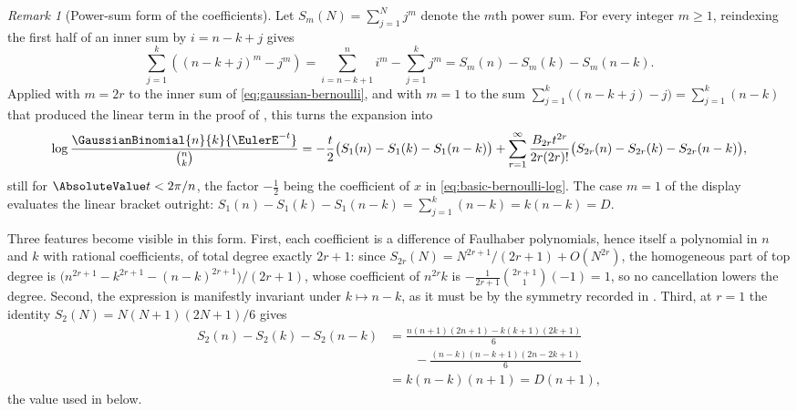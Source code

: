\documentclass[11pt,a4paper,oneside,openany]{book}
\theoremstyle{definition}
\theoremstyle{remark}
\newtheorem{remark}[remark]{Remark}
\begin{document}
\begin{remark}[Power-sum form of the coefficients]
Let $S_m(N)=\sum_{j=1}^{N}j^{m}$ denote the $m$th power sum.  For every integer $m\ge1$, reindexing the first half of an inner sum by $i=n-k+j$ gives
\[
 \sum_{j=1}^{k}\left((n-k+j)^{m}-j^{m}\right)
 =\sum_{i=n-k+1}^{n}i^{m}-\sum_{j=1}^{k}j^{m}
 =S_{m}(n)-S_{m}(k)-S_{m}(n-k).
\]
Applied with $m=2r$ to the inner sum of \eqref{eq:gaussian-bernoulli}, and with $m=1$ to the sum $\sum_{j=1}^{k}\bigl((n-k+j)-j\bigr)=\sum_{j=1}^{k}(n-k)$ that produced the linear term in the proof of , this turns the expansion into
\[
 \log\frac{\GaussianBinomial{n}{k}{\EulerE^{-t}}}{\binom nk}
 =-\frac t2\bigl(S_1(n)-S_1(k)-S_1(n-k)\bigr)
 +\sum_{r=1}^{\infty}\frac{B_{2r}t^{2r}}{2r(2r)!}
 \bigl(S_{2r}(n)-S_{2r}(k)-S_{2r}(n-k)\bigr),
\]
still for $\AbsoluteValue t<2\pi/n$, the factor $-\tfrac12$ being the coefficient of $x$ in \eqref{eq:basic-bernoulli-log}.  The case $m=1$ of the display evaluates the linear bracket outright: $S_1(n)-S_1(k)-S_1(n-k)=\sum_{j=1}^{k}(n-k)=k(n-k)=D$.

Three features become visible in this form.  First, each coefficient is a difference of Faulhaber polynomials, hence itself a polynomial in $n$ and $k$ with rational coefficients, of total degree exactly $2r+1$: since $S_{2r}(N)=N^{2r+1}/(2r+1)+O(N^{2r})$, the homogeneous part of top degree is $\bigl(n^{2r+1}-k^{2r+1}-(n-k)^{2r+1}\bigr)/(2r+1)$, whose coefficient of $n^{2r}k$ is $-\tfrac1{2r+1}\binom{2r+1}{1}(-1)=1$, so no cancellation lowers the degree.  Second, the expression is manifestly invariant under $k\mapsto n-k$, as it must be by the symmetry recorded in .  Third, at $r=1$ the identity $S_2(N)=N(N+1)(2N+1)/6$ gives
\begin{align*}
 S_2(n)-S_2(k)-S_2(n-k)
 &=\frac{n(n+1)(2n+1)-k(k+1)(2k+1)}{6}\\
 &\qquad-\frac{(n-k)(n-k+1)(2n-2k+1)}{6}\\
 &=k(n-k)(n+1)=D(n+1),
\end{align*}
the value used in  below.
\end{remark}

\end{document}

